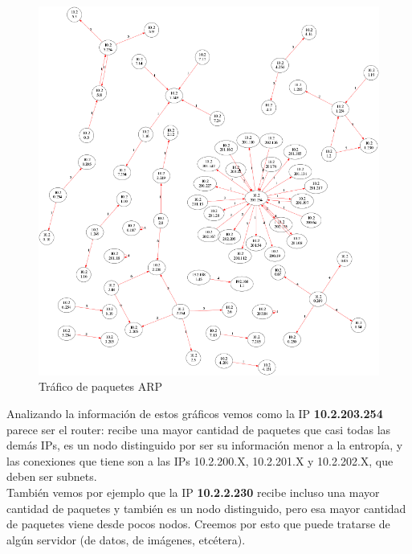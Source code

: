\begin{figure}[H]
       \centering
       \includegraphics[width=1\textwidth]{../resultados/labo-corrida3/network.png}
       \caption{Tráfico de paquetes ARP}
       \label{red-Starbucks-dst-information}
\end{figure}

Analizando la información de estos gráficos vemos como la IP \textbf{10.2.203.254} parece ser el router: recibe una mayor cantidad de paquetes que casi todas las demás IPs, es un nodo distinguido por ser su información menor a la entropía, y las conexiones que tiene son a las IPs 10.2.200.X, 10.2.201.X y 10.2.202.X, que deben ser subnets.\\

También vemos por ejemplo que la IP \textbf{10.2.2.230} recibe incluso una mayor cantidad de paquetes y  también es un nodo distinguido, pero esa mayor cantidad de paquetes viene desde pocos nodos. Creemos por esto que puede tratarse de algún servidor (de datos, de imágenes, etcétera).
